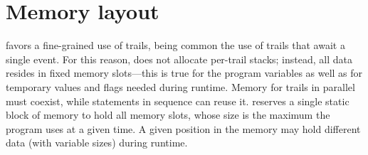 \section{Memory layout}
\label{sec:impl:memory}

\CEU{} favors a fine-grained use of trails, being common the use of trails that 
await a single event.
For this reason, \CEU{} does not allocate per-trail stacks; instead, all data 
resides in fixed memory slots---this is true for the program variables as well 
as for temporary values and flags needed during runtime.
%
Memory for trails in parallel must coexist, while statements in sequence can 
reuse it.
%
\CEU reserves a single static block of memory to hold all memory slots, whose 
size is the maximum the program uses at a given time.
A given position in the memory may hold different data (with variable sizes) 
during runtime.

